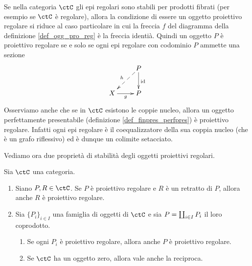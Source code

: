 \begin{remark}\label{oss_pro_reg}
 Se nella categoria \(\ctC\) gli epi regolari sono stabili per prodotti fibrati (per esempio se \(\ctC\) è regolare), allora la condizione
 di essere un oggetto proiettivo regolare si riduce al caso particolare in cui la freccia \(f\) del diagramma della definizione
 \ref{def_ogg_pro_reg} è la freccia identià. Quindi un oggetto \(P\) è proiettivo regolare se e solo se ogni epi regolare
 con codominio \(P\) ammette una sezione
 \[\xymatrix{ & P \ar@{-->}[ld]_{h} \ar[d]^{\id} \\ X \ar[r]_-{g} & P}\]
 Osserviamo anche che se in \(\ctC\) esistono le coppie nucleo, allora un oggetto perfettamente presentabile (definizione
 \ref{def_finpres_perfpres}) è proiettivo regolare. Infatti ogni epi regolare è il coequalizzatore della sua coppia nucleo (che è un
 grafo riflessivo) ed è dunque un colimite setacciato.
\end{remark}

Vediamo ora due proprietà di stabilità degli oggetti proiettivi regolari.

\begin{proposition}\label{prop_stab_proreg}
 Sia \(\ctC\) una categoria.
 \begin{enumerate}
  \item Siano \(P,R \in \ctC\). Se \(P\) è proiettivo regolare e \(R\) è un retratto di \(P\), allora anche \(R\) è proiettivo regolare.
  \item Sia \(\{P_i\}_{i \in I}\) una famiglia di oggetti di \(\ctC\) e sia \(P = \coprod_{i \in I}P_i\) il loro coprodotto.
        \begin{enumerate}
         \item Se ogni \(P_i\) è proiettivo regolare, allora anche \(P\) è proiettivo regolare.
         \item Se \(\ctC\) ha un oggetto zero, allora vale anche la reciproca.
        \end{enumerate}
 \end{enumerate}
\end{proposition}

